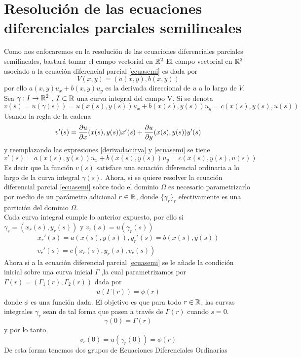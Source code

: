 \section{Resolución de las ecuaciones diferenciales parciales semilineales}
Como nos enfocaremos en la resolución de las ecuaciones diferenciales parciales semilineales, bastará tomar el campo vectorial en ${\mathbb{R}}^2$
El campo vectorial en ${\mathbb{R}}^2$ asociado a la ecuación diferencial parcial \ref{ecuasemi} es dada por 
$$V(x,y)=(a(x,y),b(x,y))$$
por ello $a(x,y)u_x+b(x,y)u_y$ es la derivada direccional de $u$ a lo largo de $V$.\\
Sea  $\gamma:I\rightarrow{\mathbb{R}}^2$ , $I\subset{\mathbb{R}}$ una curva integral del campo V.
Si se denota $v(s)=u(\gamma(s))=u(x(s),y(s))u_x+b(x(s),y(s))u_y=c(x(s),y(s),u(s))$
Usando la regla de la cadena $$v'(s)=\frac{\partial u}{\partial x}(x(s),y(s))x'(s)+\frac{\partial u}{\partial y}(x(s),y(s))y'(s)$$ y reemplazando las expresiones \ref{derivadacurva} y \ref{ecuasemi} se tiene $$v'(s)=a(x(s),y(s))u_x+b(x(s),y(s))u_y=c(x(s),y(s),u(s))$$
Es decir que la función $v(s)$ satisface una ecuación diferencial ordinaria a lo largo de la curva integral $\gamma(s)$.
Ahora, si se quiere resolver la ecuación diferencial parcial \ref{ecuasemi} sobre todo el dominio $\Omega$ es necesario parametrizarlo por medio de un parámetro adicional $r\in{\mathbb{R}}$, donde $\{\gamma_r\}_r$ efectivamente es una partición del dominio $\Omega$. \\
Cada curva integral cumple lo anterior expuesto, por ello si $\gamma_r=(x_r(s),y_r(s))$ y $v_r(s)=u(\gamma_r(s))$
\begin{eqnarray*}
x_r'(s)=a(x(s),y(s)), y_r'(s)=b(x(s),y(s))\label{derivadacurvar}\\
v_r'(s)=c(x_r(s),y_r(s),v_r(s))
\end{eqnarray*}
Ahora si a la ecuación diferencial parcial \ref{ecuasemi} se le añade la condición inicial sobre una curva inicial $\Gamma$ ,la cual parametrizamos por $\Gamma(r)=(\Gamma_1(r),\Gamma_2(r))$ dada por
\begin{eqnarray}
u(\Gamma(r))=\phi(r) \label{condinicial}
\end{eqnarray}
donde $\phi$ es una función dada.
El objetivo es que para todo $r\in{\mathbb{R}}$, las curvas integrales $\gamma_r$  sean de tal forma que pasen a través de $\Gamma(r)$ cuando $s=0$.
$$\gamma(0)=\Gamma(r)$$
y por lo tanto,
$$v_r(0)=u(\gamma_r(0))=\phi(r)$$
De esta forma tenemos dos grupos de Ecuaciones Diferenciales Ordinarias
